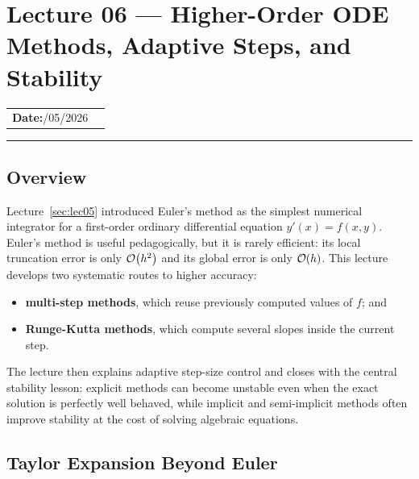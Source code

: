 
\section{Lecture 06 — Higher-Order ODE Methods, Adaptive Steps, and
  Stability}\label{sec:lec06}

\begin{center}
\begin{tabular}{ll}
  \textbf{Date:}\quad 03/05/2026 & \\
\end{tabular}
\end{center}
\hrule\vspace{1.5em}

\subsection*{Overview}
Lecture~\ref{sec:lec05} introduced Euler's method as the simplest numerical
integrator for a first-order ordinary differential equation
$y'(x)=f(x,y)$. Euler's method is useful pedagogically, but it is rarely
efficient: its local truncation error is only $\mathcal{O}\!\left(h^2\right)$ and its global
error is only $\mathcal{O}\!\left(h\right)$. This lecture develops two systematic routes to
higher accuracy:
\begin{itemize}
    \item \textbf{multi-step methods}, which reuse previously computed values
    of $f$; and
    \item \textbf{Runge-Kutta methods}, which compute several slopes inside
    the current step.
\end{itemize}
The lecture then explains adaptive step-size control and closes with the
central stability lesson: explicit methods can become unstable even when the
exact solution is perfectly well behaved, while implicit and semi-implicit
methods often improve stability at the cost of solving algebraic equations.

\subsection{Taylor Expansion Beyond Euler}\label{subsec:lec06:taylor}


